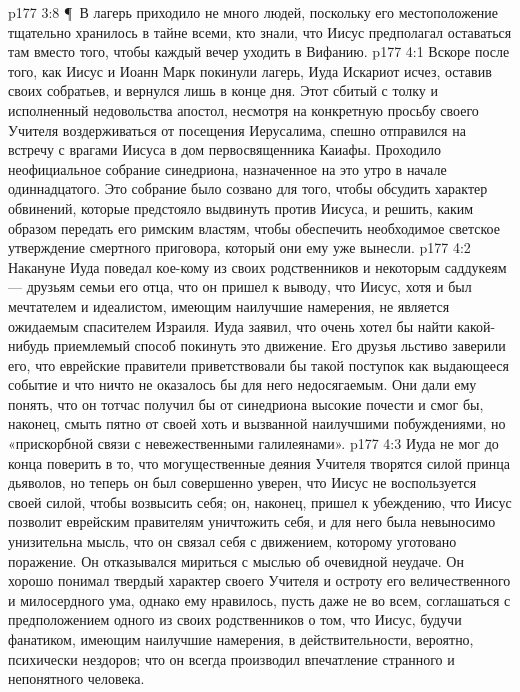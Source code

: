 \vs p177 3:8 \P\ В лагерь приходило не много людей, поскольку его местоположение тщательно хранилось в тайне всеми, кто знали, что Иисус предполагал оставаться там вместо того, чтобы каждый вечер уходить в Вифанию.
\vs p177 4:1 Вскоре после того, как Иисус и Иоанн Марк покинули лагерь, Иуда Искариот исчез, оставив своих собратьев, и вернулся лишь в конце дня. Этот сбитый с толку и исполненный недовольства апостол, несмотря на конкретную просьбу своего Учителя воздерживаться от посещения Иерусалима, спешно отправился на встречу с врагами Иисуса в дом первосвященника Каиафы. Проходило неофициальное собрание синедриона, назначенное на это утро в начале одиннадцатого. Это собрание было созвано для того, чтобы обсудить характер обвинений, которые предстояло выдвинуть против Иисуса, и решить, каким образом передать его римским властям, чтобы обеспечить необходимое светское утверждение смертного приговора, который они ему уже вынесли.
\vs p177 4:2 Накануне Иуда поведал кое\hyp{}кому из своих родственников и некоторым саддукеям --- друзьям семьи его отца, что он пришел к выводу, что Иисус, хотя и был мечтателем и идеалистом, имеющим наилучшие намерения, не является ожидаемым спасителем Израиля. Иуда заявил, что очень хотел бы найти какой\hyp{}нибудь приемлемый способ покинуть это движение. Его друзья льстиво заверили его, что еврейские правители приветствовали бы такой поступок как выдающееся событие и что ничто не оказалось бы для него недосягаемым. Они дали ему понять, что он тотчас получил бы от синедриона высокие почести и смог бы, наконец, смыть пятно от своей хоть и вызванной наилучшими побуждениями, но «прискорбной связи с невежественными галилеянами».
\vs p177 4:3 Иуда не мог до конца поверить в то, что могущественные деяния Учителя творятся силой принца дьяволов, но теперь он был совершенно уверен, что Иисус не воспользуется своей силой, чтобы возвысить себя; он, наконец, пришел к убеждению, что Иисус позволит еврейским правителям уничтожить себя, и для него была невыносимо унизительна мысль, что он связал себя с движением, которому уготовано поражение. Он отказывался мириться с мыслью об очевидной неудаче. Он хорошо понимал твердый характер своего Учителя и остроту его величественного и милосердного ума, однако ему нравилось, пусть даже не во всем, соглашаться с предположением одного из своих родственников о том, что Иисус, будучи фанатиком, имеющим наилучшие намерения, в действительности, вероятно, психически нездоров; что он всегда производил впечатление странного и непонятного человека.
